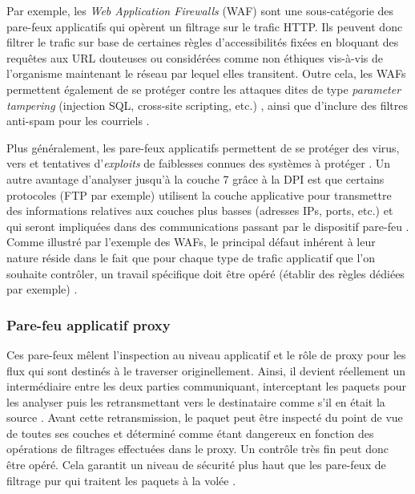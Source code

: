 \documentclass[]{article}
\begin{document}
\label{waf}
\par Par exemple, les \textit{Web Application Firewalls} (WAF) sont une sous-catégorie des pare-feux applicatifs qui opèrent un filtrage sur le trafic HTTP. Ils peuvent donc filtrer le trafic sur base de certaines règles d'accessibilités fixées en bloquant des requêtes aux URL douteuses ou considérées comme non éthiques vis-à-vis de l'organisme maintenant le réseau par lequel elles transitent. Outre cela, les WAFs permettent également de se protéger contre les attaques dites de type \textit{parameter tampering} (injection SQL, cross-site scripting, etc.) \cite{Palka2011}, ainsi que d'inclure des filtres anti-spam pour les courriels \cite{wikifwFR}.\\

\par Plus généralement, les pare-feux applicatifs permettent de se protéger des virus, vers et tentatives d'\textit{exploits} de faiblesses connues des systèmes à protéger \cite{wikiappfw} \cite{Palka2011}. Un autre avantage d'analyser jusqu'à la couche 7 grâce à la DPI est que certains protocoles (FTP par exemple) utilisent la couche applicative pour transmettre des informations relatives aux couches plus basses (adresses IPs, ports, etc.) et qui seront impliquées dans des communications passant par le dispositif pare-feu \cite{wikifwFR}. Comme illustré par l'exemple des WAFs, le principal défaut inhérent à leur nature réside dans le fait que pour chaque type de trafic applicatif que l'on souhaite contrôler, un travail spécifique doit être opéré (établir des règles dédiées par exemple) \cite{wikifw}. 

\newpage

\subsubsection{Pare-feu applicatif proxy}

Ces pare-feux mêlent l'inspection au niveau applicatif et le rôle de proxy pour les flux qui sont destinés à le traverser originellement. Ainsi, il devient réellement un intermédiaire entre les deux parties communiquant, interceptant les paquets pour les analyser puis les retransmettant vers le destinataire comme s'il en était la source \cite{Shimonski2013}. Avant cette retransmission, le paquet peut être inspecté du point de vue de toutes ses couches et déterminé comme étant dangereux en fonction des opérations de filtrages effectuées dans le proxy. Un contrôle très fin peut donc être opéré. Cela garantit un niveau de sécurité plus haut que les pare-feux de filtrage pur qui traitent les paquets à la volée \cite{frameIP}.\\
\end{document}
